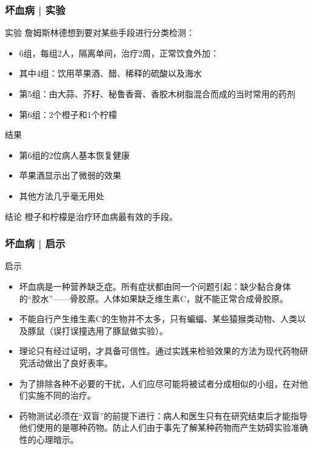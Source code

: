 \begin{frame}
  \frametitle{坏血病 | 实验}
  \begin{block}{实验}
    詹姆斯\textbullet 林德想到要对某些手段进行分类检测：
    \begin{itemize}
      \item 6组，每组2人，隔离单间，治疗2周，正常饮食外加：
      \item 其中4组：饮用苹果酒、醋、稀释的硫酸以及海水
      \item 第5组：由大蒜、芥籽、秘鲁香膏、香胶木树脂混合而成的当时常用的药剂
      \item 第6组：2个橙子和1个柠檬
    \end{itemize}
  \end{block}
  \pause
  \begin{block}{结果}
    \begin{itemize}
      \item 第6组的2位病人基本恢复健康
      \item 苹果酒显示出了微弱的效果
      \item 其他方法几乎毫无用处
    \end{itemize}
  \end{block}
  \pause
  \begin{block}{结论}
    橙子和柠檬是治疗环血病最有效的手段。
  \end{block}
\end{frame}

\begin{frame}
  \frametitle{坏血病 | 启示}
  \begin{block}{启示}
  \begin{itemize}
    \item 坏血病是一种营养缺乏症。所有症状都由同一个问题引起：缺少黏合身体的“胶水”——骨胶原。人体如果缺乏维生素C，就不能正常合成骨胶原。
    \item 不能自行产生维生素C的生物并不太多，只有蝙蝠、某些猿猴类动物、人类以及豚鼠（误打误撞选用了豚鼠做实验）。
    \item 理论只有经过证明，才具备可信性。通过实践来检验效果的方法为现代药物研究活动做出了良好表率。
    \item 为了排除各种不必要的干扰，人们应尽可能将被试者分成相似的小组，在对他们实施不同的治疗。
    \item 药物测试必须在“双盲”的前提下进行：病人和医生只有在研究结束后才能指导他们使用的是哪种药物。防止人们由于事先了解某种药物而产生妨碍实验准确性的心理暗示。 
  \end{itemize}
  \end{block}
\end{frame}

